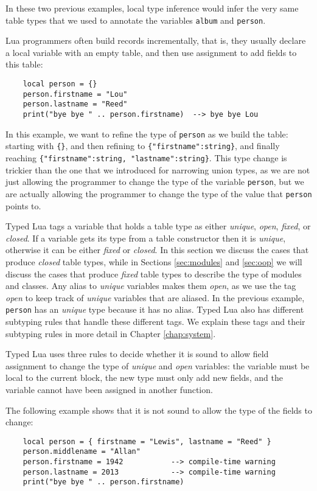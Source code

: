 In these two previous examples, local type inference would infer the
very same table types that we used to annotate the variables
\texttt{album} and \texttt{person}.

Lua programmers often build records incrementally, that is,
they usually declare a local variable with an empty table,
and then use assignment to add fields to this table:
\begin{verbatim}
    local person = {}
    person.firstname = "Lou"
    person.lastname = "Reed"
    print("bye bye " .. person.firstname)  --> bye bye Lou
\end{verbatim}

In this example, we want to refine the type of \texttt{person} as
we build the table:
starting with \texttt{\{\}}, and then refining to \texttt{\{"firstname":string\}},
and finally reaching \texttt{\{"firstname":string, "lastname":string\}}.
This type change is trickier than the one that we introduced for narrowing
union types, as we are not just allowing the programmer to change
the type of the variable \texttt{person}, but we are actually allowing
the programmer to change the type of the value that \texttt{person} points to.

Typed Lua tags a variable that holds a table type as either
\emph{unique}, \emph{open}, \emph{fixed}, or \emph{closed}.
If a variable gets its type from a table constructor then it is
\emph{unique}, otherwise it can be either \emph{fixed} or
\emph{closed}.
In this section we discuss the cases that produce \emph{closed}
table types, while in Sections \ref{sec:modules} and \ref{sec:oop}
we will discuss the cases that produce \emph{fixed} table types
to describe the type of modules and classes.
Any alias to \emph{unique} variables makes them \emph{open}, as we use the
tag \emph{open} to keep track of \emph{unique} variables that are aliased.
In the previous example, \texttt{person} has an \emph{unique} type
because it has no alias.
Typed Lua also has different subtyping rules that handle these
different tags.
We explain these tags and their subtyping rules in more detail
in Chapter \ref{chap:system}.

Typed Lua uses three rules to decide whether it is sound to
allow field assignment to change the type of \emph{unique} and
\emph{open} variables:
the variable must be local to the current block,
the new type must only add new fields, and
the variable cannot have been assigned in another function.

The following example shows that it is not sound to allow the
type of the fields to change:
\begin{verbatim}
    local person = { firstname = "Lewis", lastname = "Reed" }
    person.middlename = "Allan"
    person.firstname = 1942           --> compile-time warning
    person.lastname = 2013            --> compile-time warning
    print("bye bye " .. person.firstname)
\end{verbatim}

